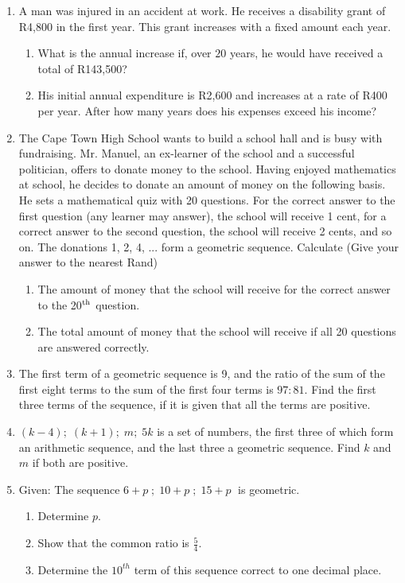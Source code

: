 \begin{enumerate}
\item A man was injured in an accident at work. He receives a disability grant of R4,800 in the first year. This grant increases with a fixed amount each year.
\begin{enumerate}
\item What is the annual increase if, over $20$ years, he would have received a total of R143,500?
\item His initial annual expenditure is R2,600 and increases at a rate of R400 per year. After how many years does his expenses exceed his income?
\end{enumerate}
\item{The Cape Town High School wants to build a school hall and is busy with fundraising. Mr. Manuel, an ex-learner of the school and a successful politician, offers to donate money to the school. Having enjoyed mathematics at school, he decides to donate an amount of money on the following basis.
He sets a mathematical quiz with 20 questions. For the correct answer to the first question (any learner may answer), the school will receive 1 cent, for a correct answer to the second question, the school will receive 2 cents, and so on. The donations 1, 2, 4, ... form a geometric sequence. Calculate (Give your answer to the nearest Rand)
\begin{enumerate}
\item{The amount of money that the school will receive for the correct answer to the 20$^{\rm{th}}$ question.}
\item{The total amount of money that the school will receive if all 20 questions are answered correctly.}
\end{enumerate}
}
\item{The first term of a geometric sequence is 9, and the ratio of the sum of the first eight terms to the sum of the first four terms is $97:81$. Find the first three terms of the sequence, if it is given that all the terms are positive.}

\item{$(k-4); \; (k+1); \; m; \; 5k$ is a set of numbers, the first three of which form an arithmetic sequence, and the last three a geometric sequence. Find $k$ and $m$ if both are positive.}

\item{Given: The sequence $6+p \;\!; \; 10+p\;\!; \; 15+p \;$ is geometric.}
\begin{enumerate}
\item{Determine $p$.}
\item{Show that the common ratio is $\tfrac{5}{4}$.}
\item{Determine the $10^{th}$ term of this sequence correct to one decimal place.}
\end{enumerate}


\end{enumerate}
